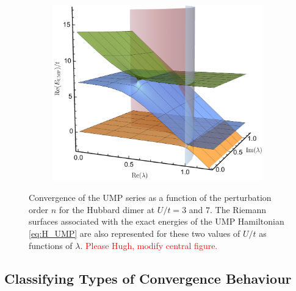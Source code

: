 \documentclass[aps,prb,reprint,noshowkeys,linenumbers,superscriptaddress]{revtex4-1}
\newcommand{\titou}[1]{\textcolor{red}{#1}}
\begin{document}
\begin{figure}
\begin{subfigure}{0.32\textwidth}
	\includegraphics[height=0.75\textwidth]{fig3c}	
    \end{subfigure}	\caption{
	Convergence of the UMP series as a function of the perturbation order $n$ for the Hubbard dimer at $U/t = 3$ and $7$.
	The Riemann surfaces associated with the exact energies of the UMP Hamiltonian \eqref{eq:H_UMP} are also represented for these two values of $U/t$ as functions of $\lambda$. \titou{Please Hugh, modify central figure.}
	\label{fig:UMP}}
\end{figure}


\subsection{Classifying Types of Convergence Behaviour} %
\end{document}
